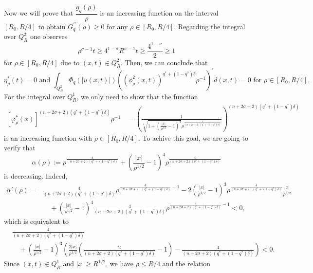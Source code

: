 \documentclass[11pt,reqno]{amsart}
\newcommand{\tron}[1]{\left( #1 \right)}
\numberwithin{equation}{section}
\theoremstyle{plain}
\begin{document}
Now we will prove that $\dfrac{g_q(\rho)}{\rho}$ is an increasing function on the interval $[R_0,R/4]$ to obtain $G^{\prime\prime}_q(\rho)\geq 0$ for any $\rho \in [R_0,R/4]$. Regarding the integral over $Q^2_R$ one observes
\[
\rho^{\sigma-1}t\geq 4^{1-\sigma}R^{\sigma-1}t\geq \frac{4^{1-\sigma}}{2}\geq 1
\]
for $\rho\in \left[R_0,R/4\right]$ due to $(x,t)\in Q^2_R$. Then, we can conclude that
\[
\eta_{\rho}^*(t)=0\text{ and }\int_{Q^2_{R}} \Phi_q(|u(x, t)|)\left(\left(\phi^2_\rho(x, t)\right)^{q^*+(1-q^*)\delta}\rho^{-1}\right)^{\prime}d(x, t)=0\text{ for $\rho \in \left[R_0,R/4\right]$}.
\]
For the integral over $Q^1_R$, we only need to show that the function
\[
\begin{aligned}
\left[\varphi^*_{\rho}(x)\right]^{(n+2\sigma+2)(q^*+(1-q^*)\delta)}\rho^{-1}&=\tron{\frac{1}{\sqrt[4]{1+\tron{\frac{|x|}{\rho^{1/2}}-1}^4}\rho^{\frac{1}{(n+2\sigma+2)(q^*+(1-q^*)\delta)}}}}^{(n+2\sigma+2)(q^*+(1-q^*)\delta)}
\end{aligned}
\]
is an increasing function with $\rho\in \left[R_0,R/4\right]$. To achive this goal, we are going to verify that
\begin{equation}\label{eq21sec3.2}
\alpha(\rho):= \rho^{\frac{4}{(n+2\sigma+2)(q^*+(1-q^*)\delta)}}+\tron{\frac{|x|}{\rho^{1/2}}-1}^4\rho^{\frac{4}{(n+2\sigma+2)(q^*+(1-q^*)\delta)}}
\end{equation}
is decreasing. Indeed,
\begin{equation}\label{eq22sec3.2}
\begin{aligned}
\alpha'(\rho)= &\frac{4}{(n+2\sigma+2)(q^*+(1-q^*)\delta)}\rho^{\frac{4}{(n+2\sigma+2)(q^*+(1-q^*)\delta)}-1}-2\tron{\frac{|x|}{\rho^{1/2}}-1}^{3}\rho^{\frac{4}{(n+2\sigma+2)(q^*+(1-q^*)\delta)}}\frac{|x|}{\rho^{3/2}}\\
&\quad +\tron{\frac{|x|}{\rho^{1/2}}-1}^{4}\frac{4}{(n+2\sigma+2)(q^*+(1-q^*)\delta)}\rho^{\frac{4}{(n+2\sigma+2)(q^*+(1-q^*)\delta)}-1}<0,
\end{aligned}
\end{equation}
which is equivalent to
\begin{equation}\label{eq23sec3.2}
\begin{aligned}
&\frac{4}{(n+2\sigma+2)(q^*+(1-q^*)\delta)}\\
&\quad+\tron{\frac{|x|}{\rho^{1/2}}-1}^{3}\tron{\frac{2|x|}{\rho^{1/2}}\tron{\frac{2}{(n+2\sigma+2)(q^*+(1-q^*)\delta)}-1}-\frac{4}{(n+2\sigma+2)(q^*+(1-q^*)\delta)}}< 0.
\end{aligned}
\end{equation}
Since $(x,t)\in Q^1_R$ and $|x| \geq R^{1/2}$, we have $\rho\leq R/4$ and the relation
\end{document}
